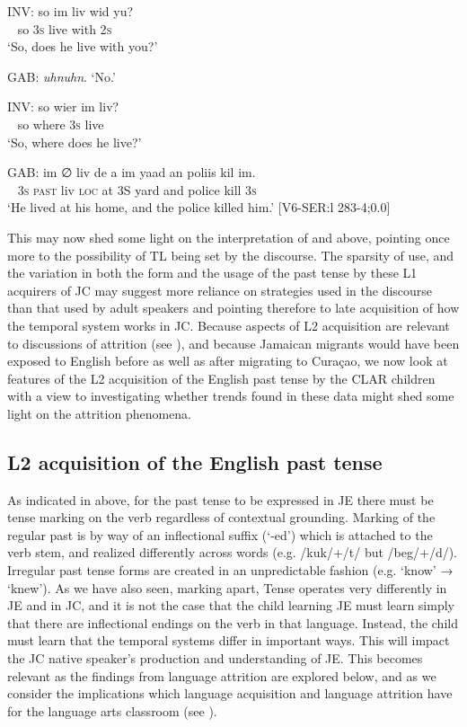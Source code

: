 \documentclass[output=paper,colorlinks,citecolor=brown]{langscibook}
\begin{document}
\ea \label{bkm:messamK:13}
\gll INV:   so im liv   wid   yu?\\
~ so 3\textsc{s} live with 2\textsc{s}\\
\glt \hphantom{INV:}   `So, does he live with you?’

 GAB:  \textit{uhnuhn}.
\glt  `No.’

\gll   INV:   so wier    im liv?\\
~ so where 3\textsc{s} live\\
\glt \hphantom{INV:}  `So, where does he live?’

\gll   GAB:   im ∅  liv de    a  im yaad an   poliis  kil  im.\\
    ~ 3\textsc{s} \textsc{past} liv \textsc{loc} at 3\textsc{S} yard  and police kill 3\textsc{s}\\
\glt \hphantom{GAB:}  `He lived at his home, and the police killed him.’ [V6-SER:l 283-4;0.0]
\z



This may now shed some light on the interpretation of  and  above, pointing once more to the possibility of TL being set by the discourse. The sparsity of use, and the variation in both the form and the usage of the past tense by these L1 acquirers of JC may suggest more reliance on strategies used in the discourse than that used by adult speakers and pointing therefore to late acquisition of how the temporal system works in JC. Because aspects of L2 acquisition are relevant to discussions of attrition (see ), and because Jamaican migrants would have been exposed to English before as well as after migrating to Curaçao, we now look at features of the L2 acquisition of the English past tense by the CLAR children with a view to investigating whether trends found in these data might shed some light on the attrition phenomena.



\subsection{L2 acquisition of the English past tense} \label{sec:messamk:4.3}

As indicated in  above, for the past tense to be expressed in JE there must be tense marking on the verb regardless of contextual grounding. Marking of the regular past is by way of an inflectional suffix (‘-ed’) which is attached to the verb stem, and realized differently across words (e.g. /kuk/+/t/ but /beg/+/d/). Irregular past tense forms are created in an unpredictable fashion (e.g. ‘know’ → ‘knew’).  As we have also seen, marking apart, Tense operates very differently in JE and in JC, and it is not the case that the child learning JE must learn simply that there are inflectional endings on the verb in that language. Instead, the child must learn that the temporal systems differ in important ways. This will impact the JC native speaker’s production and understanding of JE. This becomes relevant as the findings from language attrition are explored below, and as we consider the implications which language acquisition and language attrition have for the language arts classroom (see ).
\end{document}
